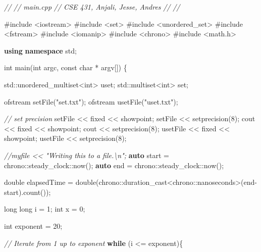 \documentclass[11pt]{article}
\newenvironment{Shaded}{}{}
\newcommand{\KeywordTok}[1]{\textcolor[rgb]{0.00,0.44,0.13}{\textbf{{#1}}}}
\newcommand{\DataTypeTok}[1]{\textcolor[rgb]{0.56,0.13,0.00}{{#1}}}
\newcommand{\DecValTok}[1]{\textcolor[rgb]{0.25,0.63,0.44}{{#1}}}
\newcommand{\StringTok}[1]{\textcolor[rgb]{0.25,0.44,0.63}{{#1}}}
\newcommand{\CommentTok}[1]{\textcolor[rgb]{0.38,0.63,0.69}{\textit{{#1}}}}
\newcommand{\NormalTok}[1]{{#1}}
\newcommand{\ImportTok}[1]{{#1}}
\newcommand{\ControlFlowTok}[1]{\textcolor[rgb]{0.00,0.44,0.13}{\textbf{{#1}}}}
\newcommand{\BuiltInTok}[1]{{#1}}
\newcommand{\PreprocessorTok}[1]{\textcolor[rgb]{0.74,0.48,0.00}{{#1}}}
\newcommand{\AttributeTok}[1]{\textcolor[rgb]{0.49,0.56,0.16}{{#1}}}
\begin{document}
    \begin{Shaded}
\begin{Highlighting}[]
\CommentTok{//}
\CommentTok{//  main.cpp}
\CommentTok{//  CSE 431, Anjali, Jesse, Andres}
\CommentTok{//}
\CommentTok{//}

\PreprocessorTok{#include }\ImportTok{<iostream>}
\PreprocessorTok{#include }\ImportTok{<set>}
\PreprocessorTok{#include }\ImportTok{<unordered_set>}
\PreprocessorTok{#include }\ImportTok{<fstream>}
\PreprocessorTok{#include }\ImportTok{<iomanip>}
\PreprocessorTok{#include }\ImportTok{<chrono>}
\PreprocessorTok{#include }\ImportTok{<math.h>}

\KeywordTok{using} \KeywordTok{namespace}\NormalTok{ std;}

\DataTypeTok{int}\NormalTok{ main(}\DataTypeTok{int}\NormalTok{ argc, }\AttributeTok{const} \DataTypeTok{char}\NormalTok{ * argv[]) \{}
    
    
    \BuiltInTok{std::}\NormalTok{unordered_multiset<}\DataTypeTok{int}\NormalTok{> uset;}
    \BuiltInTok{std::}\NormalTok{multiset<}\DataTypeTok{int}\NormalTok{> set;}

\NormalTok{    ofstream setFile(}\StringTok{"set.txt"}\NormalTok{);}
\NormalTok{    ofstream usetFile(}\StringTok{"uset.txt"}\NormalTok{);}
    
    \CommentTok{// set precision}
\NormalTok{    setFile << fixed << showpoint;}
\NormalTok{    setFile << setprecision(}\DecValTok{8}\NormalTok{);}
\NormalTok{    cout << fixed << showpoint;}
\NormalTok{    cout << setprecision(}\DecValTok{8}\NormalTok{);}
\NormalTok{    usetFile << fixed << showpoint;}
\NormalTok{    usetFile << setprecision(}\DecValTok{8}\NormalTok{);}
    
    \CommentTok{//myfile << "Writing this to a file.\textbackslash{}n";}
    \KeywordTok{auto}\NormalTok{ start = chrono::steady_clock::now();}
    \KeywordTok{auto}\NormalTok{ end = chrono::steady_clock::now();}
    
    \DataTypeTok{double}\NormalTok{ elapsedTime = }\DataTypeTok{double}\NormalTok{(chrono::duration_cast<chrono::nanoseconds>(end-start).count());}
    
    \DataTypeTok{long} \DataTypeTok{long}\NormalTok{ i = }\DecValTok{1}\NormalTok{;}
    \DataTypeTok{int}\NormalTok{ x = }\DecValTok{0}\NormalTok{;}
    
    \DataTypeTok{int}\NormalTok{ exponent = }\DecValTok{20}\NormalTok{;}

    \CommentTok{// Iterate from 1 up to exponent}
    \ControlFlowTok{while}\NormalTok{ (i <= exponent)\{}
        

\end{Highlighting}
\end{Shaded}
\end{document}
